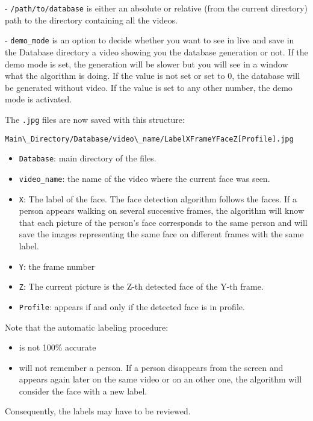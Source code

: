 - \texttt{/path/to/database} is either an absolute or relative (from the current directory) path to the directory containing all the videos.

- \texttt{demo\_mode} is an option to decide whether you want to see in live and save in the Database directory a video showing you the database generation or not. If the demo mode is set, the generation will be slower but you will see in a window what the algorithm is doing. If the value is not set or set to 0, the database will be generated without video. If the value is set to any other number, the demo mode is activated.


The \texttt{.jpg} files are now saved with this structure:

\begin{verbatim}
Main\_Directory/Database/video\_name/LabelXFrameYFaceZ[Profile].jpg
\end{verbatim}
\begin{itemize}
\item \texttt{Database}: main directory of the files.
\item \texttt{video\_name}: the name of the video where the current face was seen.
\item \texttt{X}: The label of the face. The face detection algorithm follows the faces. If a person appears walking on several successive frames, the algorithm will know that each picture of the person’s face corresponds to the same person and will save the images representing the same face on different frames with the same label.
\item \texttt{Y}: the frame number
\item \texttt{Z}: The current picture is the Z-th detected face of the Y-th frame.
\item \texttt{Profile}: appears if and only if the detected face is in profile.
\end{itemize}

Note that the automatic labeling procedure:
\begin{itemize}
\item is not 100\% accurate
\item will not remember a person. If a person disappears from the screen and appears again later on the same video or on an other one, the algorithm will consider the face with a new label.
\end{itemize}

Consequently, the labels may have to be reviewed.\\

